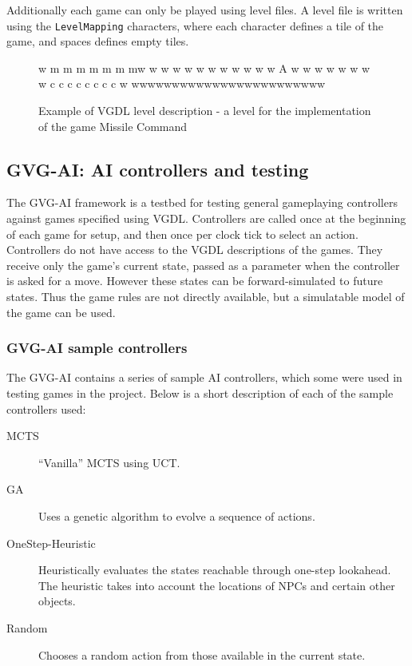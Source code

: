\documentclass[a4paper,titlepage,final]{report}
\begin{document}
Additionally each game can only be played using level files. 
A level file is written using the \texttt{LevelMapping} characters, where each character defines a tile of the game, and spaces defines empty tiles.

\begin{figure}[!ht]
\centering
\begin{vgdldesc}[linewidth=14cm]
w    m  m   m  m  m m mw
w                      w
w                      w
w                      w
w                      w
w                      w
w           A          w
w                      w
w                      w
w                      w
w   c c c c c c c c    w
wwwwwwwwwwwwwwwwwwwwwwww
\end{vgdldesc}
\caption{Example of VGDL level description - a level for the implementation of the game Missile Command}
\label{fig:vgdl}
\end{figure}



\subsection{GVG-AI: AI controllers and testing}
\label{ssec:aicontrollersandtesting}
The GVG-AI framework is a testbed for testing general gameplaying controllers against games specified using VGDL. Controllers are called once at the beginning of each game for setup, and then once per clock tick to select an action. Controllers do not have access to the VGDL descriptions of the games. They receive only the game's current state, passed as a parameter when the controller is asked for a move. However these states can be forward-simulated to future states. Thus the game rules are not directly available, but a simulatable model of the game can be used.

\subsubsection*{GVG-AI sample controllers}
The GVG-AI contains a series of sample AI controllers, which some were used in testing games in the project.
Below is a short description of each of the sample controllers used:

\begin{description}
	\item [MCTS] ``Vanilla'' MCTS using UCT.
	\item [GA] Uses a genetic algorithm to evolve a sequence of actions.
	\item [OneStep-Heuristic] Heuristically evaluates the states reachable through one-step lookahead. The heuristic takes into account the locations of NPCs and certain other objects.
    \item [Random] Chooses a random action from those available in the current state.
\end{description}
\end{document}
